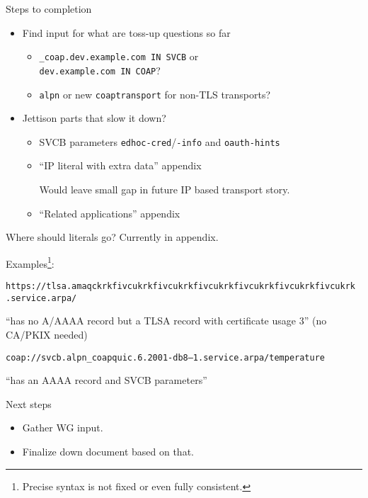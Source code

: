 \begin{frame}{Steps to completion}\Large
    \begin{itemize}
        \item Find input for what are toss-up questions so far
            \begin{itemize}\Large
                \item \texttt{\_coap.dev.example.com IN SVCB} or \\ \texttt{dev.example.com IN COAP}?
                \item \texttt{alpn} or new \texttt{coaptransport} for non-TLS transports?
            \end{itemize}
        \item Jettison parts that slow it down?
            \begin{itemize}\Large
                \item SVCB parameters \texttt{edhoc-cred}/\texttt{-info} and \texttt{oauth-hints}
                \item ``IP literal with extra data'' appendix

                    Would leave small gap in future IP based transport story.
                \item ``Related applications'' appendix
            \end{itemize}
    \end{itemize}
\end{frame}

\begin{frame}{Where should literals go?}\Large
    Currently in appendix.
    
    \bigskip

    Examples\footnote{Precise syntax is not fixed or even fully consistent.}:

    \normalsize

    \bigskip

    \texttt{https://tlsa.amaqckrkfivcukrkfivcukrkfivcukrkfivcukrkfivcukrkfivcukrk\\\qquad.service.arpa/}

    \bigskip

    ``has no A/AAAA record but a TLSA record with certificate usage 3'' (no CA/PKIX needed)

    \vspace{1cm}

    \texttt{coap://svcb.alpn\_coapquic.6.2001-db8--1.service.arpa/temperature}

    \bigskip

    ``has an AAAA record and SVCB parameters''
\end{frame}

\begin{frame}{Next steps}\Large
    \begin{itemize}
        \item Gather WG input.
        \item Finalize down document based on that.
    \end{itemize}
\end{frame}


